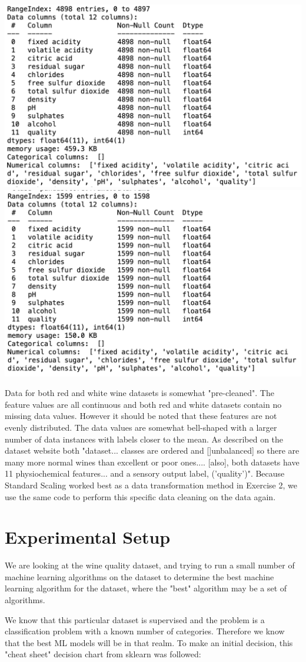 \documentclass[titlepage]{article}
\begin{document}
	\includegraphics[width=.45\textwidth]{img/white.png}
	\includegraphics[width=.45\textwidth]{img/red.png}
	
	\noindent Data for both red and white wine datasets is somewhat "pre-cleaned".   The feature values are all continuous and both red and white datasets contain no missing data values.  However it should be noted that these features are not evenly distributed.  The data values are somewhat bell-shaped with a larger number of data instances with labels closer to the mean.  As described on the dataset website \cite{dataset} both "dataset... classes are ordered and []unbalanced] so there are many more normal wines than excellent or poor ones.... [also], both datasets have 11 physiochemical features... and a sensory output label, ('quality')".  Because Standard Scaling worked best as a data transformation method in Exercise 2, we use the same code to perform this specific data cleaning on the data again.  
	
	\section*{Experimental Setup}
	
		We are looking at the wine quality dataset, and trying to run a small number of machine learning algorithms on the dataset to determine the best machine learning algorithm for the dataset, where the "best" algorithm may be a set of algorithms.
		
		We know that this particular dataset is supervised and the problem is a classification problem with a known number of categories. Therefore we know that the best ML models will be in that realm.  To make an initial decision, this "cheat sheet" decision chart from sklearn \cite{scikitlearn} was followed: 
		
\end{document}
